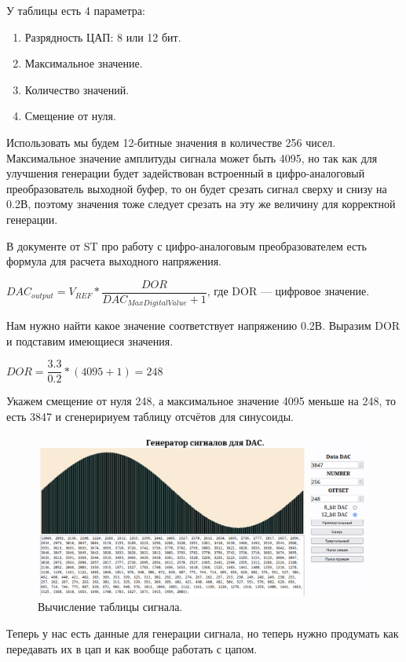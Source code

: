 	У таблицы есть 4 параметра:
	\begin{enumerate}
		\item Разрядность ЦАП: 8 или 12 бит.
		\item Максимальное значение.
		\item Количество значений.
		\item Смещение от нуля.
	\end{enumerate}
	
	Использовать мы будем 12-битные значения в количестве 256 чисел. Максимальное значение амплитуды сигнала может быть 4095, но так как для улучшения генерации будет задействован встроенный в цифро-аналоговый преобразователь выходной буфер, то он будет срезать сигнал сверху и снизу на 0.2В, поэтому значения тоже следует срезать на эту же величину для корректной генерации.
	
	В документе от ST про работу с цифро-аналоговым преобразователем есть формула для расчета выходного напряжения.
	
	$DAC_{output} = V_{REF}*\dfrac{DOR}{DAC_{MaxDigitalValue} + 1}$, где DOR --- цифровое значение.
	
	Нам нужно найти какое значение соответствует напряжению 0.2В. Выразим DOR и подставим имеющиеся значения.
	
	$DOR = \dfrac{3.3}{0.2}*(4095+1) = 248$
	
	Укажем смещение от нуля 248, а максимальное значение 4095 меньше на 248, то есть 3847 и сгенеририуем таблицу отсчётов для синусоиды. 
	
	\begin{figure}[H]
    \centering
    \includegraphics[width=1\textwidth]{../image/lut.png}
    \caption{Вычисление таблицы сигнала.}
	\end{figure}
	
	Теперь у нас есть данные для генерации сигнала, но теперь нужно продумать как передавать их в цап и как вообще работать с цапом.